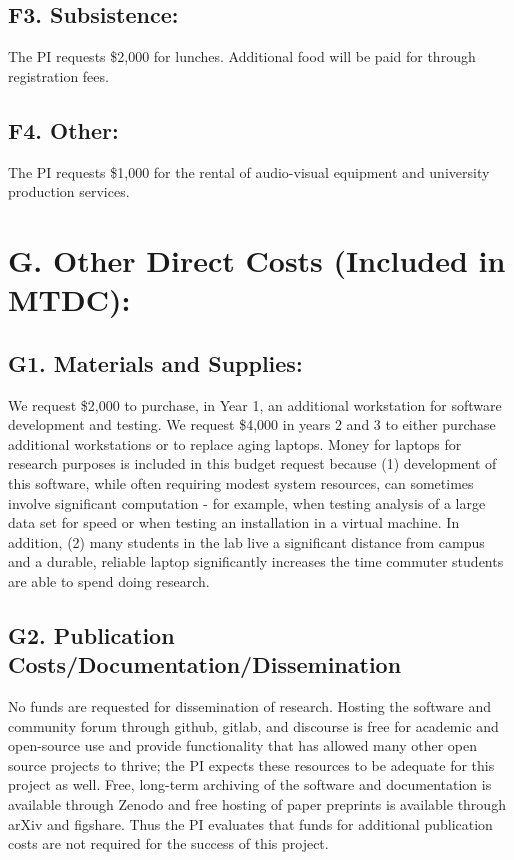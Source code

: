\documentclass[11pt,oneside]{memoir}
\begin{document}
\subsection*{F3. Subsistence:}  The PI requests \$2,000 for lunches.  Additional food will be paid for through registration fees.

\subsection*{F4. Other:}  The PI requests \$1,000 for the rental of audio-visual equipment and university production services.

\section*{G. Other Direct Costs (Included in MTDC):}
\subsection*{G1. Materials and Supplies:}
We request \$2,000 to purchase, in Year 1, an additional workstation for software development and testing. We request \$4,000 in years 2 and 3 to either purchase additional workstations or to replace aging laptops.  Money for laptops for research purposes is included in this budget request because (1) development of this software, while often requiring modest system resources, can sometimes involve significant computation - for example, when testing analysis of a large data set for speed or when testing an installation in a virtual machine.  In addition, (2) many students in the lab live a significant distance from campus and a durable, reliable laptop significantly increases the time commuter students are able to spend doing research.

\subsection*{G2. Publication Costs/Documentation/Dissemination}
No funds are requested for dissemination of research.  Hosting the software and community forum through github, gitlab, and discourse is free for academic and open-source use and provide functionality that has allowed many other open source projects to thrive; the PI expects these resources to be adequate for this project as well.  Free, long-term archiving of the software and documentation is available through Zenodo and free hosting of paper preprints is available through arXiv and figshare.  Thus the PI evaluates that funds for additional publication costs are not required for the success of this project.
\end{document}
